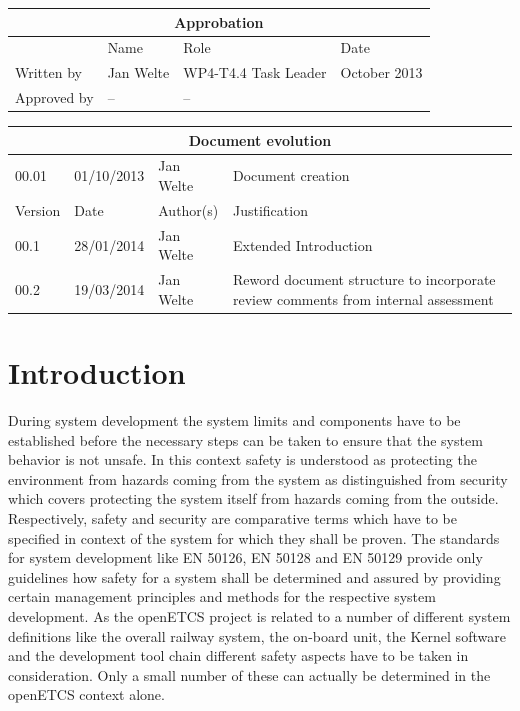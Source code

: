 \documentclass{template/openetcs_report}
\begin{document}
\begin{tabular}{|p{2.2cm}|p{4cm}|p{4cm}|p{2cm}|}
\hline
\multicolumn{4}{|c|}{Approbation} \\
\hline
  &  Name & Role & Date   \\
\hline  
Written by    &  Jan Welte & WP4-T4.4 Task Leader  &  October 2013\\
\hline
Approved by & -- & -- & \\
\hline
\end{tabular}

\begin{tabular}{|p{2.2cm}|p{2cm}|p{3cm}|p{5cm}|}
\hline
\multicolumn{4}{|c|}{Document evolution} \\
\hline
00.01 & 01/10/2013 & Jan Welte &  Document creation \\
\hline
Version &  Date & Author(s) & Justification  \\
\hline  
00.1 & 28/01/2014 & Jan Welte &  Extended Introduction  \\
00.2 & 19/03/2014 & Jan Welte &  Reword document structure to incorporate review comments from internal assessment \\
\hline  
\end{tabular}
\newpage


\mainmatter

\chapter{Introduction}
\label{sec:introduction}

During system development the system limits and components have to be established before the necessary steps can be taken to ensure that the system behavior is not unsafe. In this context safety is understood as protecting the environment from hazards coming from the system as distinguished from security which covers protecting the system itself from hazards coming from the outside. Respectively, safety and security are comparative terms which have to be specified in context of the system for which they shall be proven. The standards for system development like EN 50126, EN 50128 and EN 50129 provide only guidelines how safety for a system shall be determined and assured by providing certain management principles and methods for the respective system development. As the openETCS project is related to a number of different system definitions like the overall railway system, the on-board unit, the Kernel software and the development tool chain different safety aspects have to be taken in consideration. Only a small number of these can actually be determined in the openETCS context alone.
\end{document}
